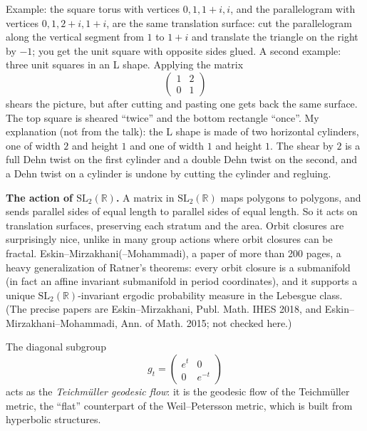 Example: the square torus with
vertices $0,1,1+i,i$, and the parallelogram
with vertices $0,1,2+i,1+i$, are the same
translation surface: cut the parallelogram
along the vertical segment from $1$ to $1+i$
and translate the triangle on the right by
$-1$; you get the unit square with opposite
sides glued. A second example: three unit
squares in an L shape. Applying the matrix
$$
\begin{pmatrix} 1 & 2 \\ 0 & 1\end{pmatrix}
$$
shears the picture, but after cutting and
pasting one gets back the same surface.
The top square is sheared ``twice''
and the bottom rectangle ``once''. My
explanation (not from the talk): the L shape
is made of two horizontal cylinders, one of
width $2$ and height $1$ and one of width $1$
and height $1$. The shear by $2$ is a full
Dehn twist on the first cylinder and a double
Dehn twist on the second, and a Dehn twist on
a cylinder is undone by cutting the cylinder
and regluing.

\medskip\noindent
{\bf The action of
$\mathrm{SL}_2(\mathbb{R})$.} A matrix in
$\mathrm{SL}_2(\mathbb{R})$ maps polygons to
polygons, and sends parallel sides of equal
length to parallel sides of equal length. So
it acts on translation surfaces, preserving
each stratum and the area. Orbit
closures are surprisingly nice, unlike in
many group actions where orbit closures can
be fractal. Eskin--Mirzakhani(--Mohammadi), a
paper of more than 200 pages, a heavy
generalization of Ratner's theorems: every
orbit closure is a submanifold (in fact an
affine invariant submanifold in period
coordinates), and it supports a unique
$\mathrm{SL}_2(\mathbb{R})$-invariant ergodic
probability measure in the Lebesgue class.
(The precise papers are Eskin--Mirzakhani,
Publ. Math. IHES 2018, and
Eskin--Mirzakhani--Mohammadi, Ann. of Math.
2015; not checked here.)

The diagonal subgroup
$$
g_t=\begin{pmatrix} e^t & 0 \\
0 & e^{-t}\end{pmatrix}
$$
acts as the \emph{Teichm\"uller geodesic
flow}: it is the geodesic flow of the
Teichm\"uller metric, the ``flat''
counterpart of the Weil--Petersson metric,
which is built from hyperbolic structures.

